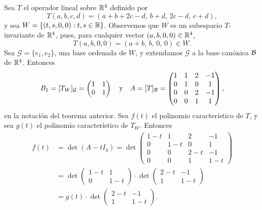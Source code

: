 \documentclass[12pt,a4paper]{book}
\begin{document}
    \begin{ejemplo}
        Sea $T$ el operador lineal sobre $\mathbb{R}^4$ definido por
        \begin{equation*}
            T(a,b,c,d)=(a+b+2c-d,\,b+d,\,2c-d,\,c+d),
        \end{equation*}
        y sea $W=\{(t,s,0,0):t,s\in\mathbb{R}\}$. Observemos que $W$ es un subespacio $T$-invariante de $\mathbb{R}^4$, pues, para cualquier vector $(a,b,0,0)\in\mathbb{R}^4$,
        \begin{equation*}
            T(a,b,0,0)=(a+b,\,b,\,0,\,0)\in W.
        \end{equation*}
        Sea $\mathcal{G}=\{e_1,e_2\}$, una base ordenada de $W$, y extendamos $\mathcal{G}$ a la base canónica $\mathcal{B}$ de $\mathbb{R}^4$. Entonces
        \begin{equation*}
            B_1=[T_W]_{\mathcal{G}}=\begin{pmatrix}1&1\\0&1\end{pmatrix}
            \quad\text{y}\quad
            A=[T]_{\mathcal{B}}=\begin{pmatrix}1&1&2&-1\\0&1&0&1\\0&0&2&-1\\0&0&1&1\end{pmatrix},
        \end{equation*}
        en la notación del teorema anterior. Sea $f(t)$ el polinomio característico de $T$, y sea $g(t)$ el polinomio característico de $T_W$. Entonces
        \begin{align*}
            f(t)&=\det(A-tI_4)=\det\begin{pmatrix}1-t&1&2&-1\\0&1-t&0&1\\0&0&2-t&-1\\0&0&1&1-t\end{pmatrix}\\
            &=\det\begin{pmatrix}1-t&1\\0&1-t\end{pmatrix}\cdot\det\begin{pmatrix}2-t&-1\\1&1-t\end{pmatrix}\\
            &=g(t)\cdot\det\begin{pmatrix}2-t&-1\\1&1-t\end{pmatrix}.
        \end{align*}
    \end{ejemplo}
\end{document}
